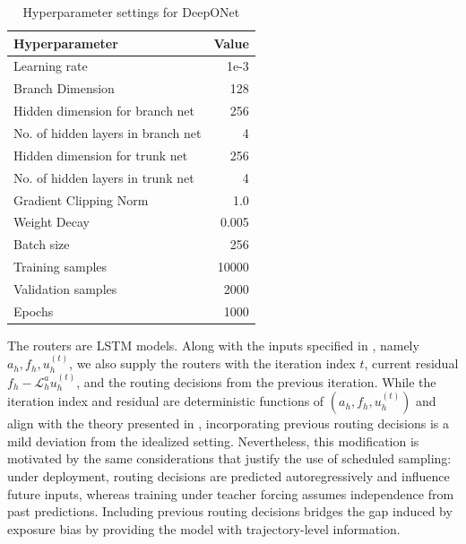 \documentclass{article}
\begin{document}
\begin{table}[H]
    \centering
    \caption{Hyperparameter settings for DeepONet}
    \begin{tabular}{lr}
        \hline
        Hyperparameter & Value\\
        \hline \hline
        Learning rate & 1e-3 \\
        Branch Dimension & 128 \\
        Hidden dimension for branch net & 256 \\
        No. of hidden layers in branch net & 4\\
        Hidden dimension for trunk net & 256 \\
        No. of hidden layers in trunk net & 4\\
        Gradient Clipping Norm & 1.0  \\
        Weight Decay & 0.005 \\
        Batch size & 256 \\
        Training samples & 10000 \\
        Validation samples & 2000 \\
        Epochs & 1000 \\
        \hline
    \end{tabular}
    \label{tab:hpsettings}
\end{table}


The routers are LSTM models. Along with the inputs specified in , namely $a_h, f_h, u_h^{(t)}$, we also supply the routers with the iteration index $t$, current residual $f_h - \mathcal{L}_h^au_h^{(t)}$, and the routing decisions from the previous iteration. While the iteration index and residual are deterministic functions of $(a_h, f_h, u_h^{(t)})$ and align with the theory presented in , incorporating previous routing decisions is a mild deviation from the idealized setting. Nevertheless, this modification is motivated by the same considerations that justify the use of scheduled sampling: under deployment, routing decisions are predicted autoregressively and influence future inputs, whereas training under teacher forcing assumes independence from past predictions. Including previous routing decisions bridges the gap induced by exposure bias by providing the model with trajectory-level information. 
\end{document}
